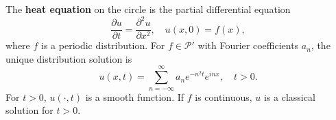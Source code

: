 The \textbf{heat equation} on the circle is the partial differential equation
$$\frac{\partial u}{\partial t} = \frac{\partial^2 u}{\partial x^2}, \quad u(x, 0) = f(x),$$
where $f$ is a periodic distribution. For $f \in \mathcal{P}'$ with Fourier coefficients $a_n$, the unique distribution solution is
$$u(x, t) = \sum_{n=-\infty}^{\infty} a_n e^{-n^2 t} e^{inx}, \quad t > 0.$$
For $t > 0$, $u(\cdot, t)$ is a smooth function. If $f$ is continuous, $u$ is a classical solution for $t > 0$.
